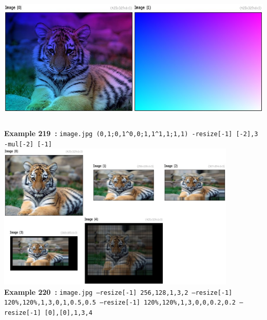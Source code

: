 \documentclass[a4paper,11pt,twoside]{book}
\begin{document}
\begin{center}\includegraphics[keepaspectratio=true,height=7cm,width=\textwidth]{img/gmic_def219.jpg}\\
{\footnotesize \textbf{Example 219~:} \texttt{image.jpg (0,1;0,1\textasciicircum 0,0;1,1\textasciicircum 1,1;1,1) -resize[-1] [-2],3 -mul[-2] [-1]}}
\\\includegraphics[keepaspectratio=true,height=7cm,width=\textwidth]{img/gmic_def220.jpg}\\
{\footnotesize \textbf{Example 220~:} \texttt{image.jpg --resize[-1] 256,128,1,3,2 --resize[-1] 120\%,120\%,1,3,0,1,0.5,0.5 --resize[-1] 120\%,120\%,1,3,0,0,0.2,0.2 --resize[-1] [0],[0],1,3,4}}
\end{center}
\end{document}
